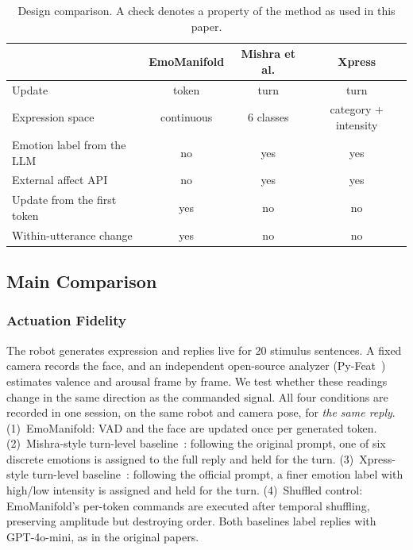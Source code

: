 \documentclass[letterpaper, 10 pt, conference]{ieeeconf/ieeeconf}
\begin{document}
\begin{table}[t]
    \caption{Design comparison. A check denotes a property of the method as used in this paper.}
    \label{tab:design}
    \centering
    \begin{tabular}{lccc}
    \toprule
     & EmoManifold & Mishra et al. & Xpress \\
    \midrule
    Update & token & turn & turn \\
    Expression space & continuous & 6 classes & category + intensity \\
    Emotion label from the LLM & no & yes & yes \\
    External affect API & no & yes & yes \\
    Update from the first token & yes & no & no \\
    Within-utterance change & yes & no & no \\
    \bottomrule
    \end{tabular}
\end{table}

\subsection{Main Comparison}
\label{sec:exp_hardware}

\subsubsection{Actuation Fidelity}
The robot generates expression and replies live for 20 stimulus sentences. A fixed camera records the face, and an independent open-source analyzer (Py-Feat~\cite{cheong2023pyfeat}) estimates valence and arousal frame by frame. We test whether these readings change in the same direction as the commanded signal. All four conditions are recorded in one session, on the same robot and camera pose, for \emph{the same reply}. (1)~EmoManifold: VAD and the face are updated once per generated token. (2)~Mishra-style turn-level baseline~\cite{mishra2023realtime}: following the original prompt, one of six discrete emotions is assigned to the full reply and held for the turn. (3)~Xpress-style turn-level baseline~\cite{antony2025xpress}: following the official prompt, a finer emotion label with high/low intensity is assigned and held for the turn. (4)~Shuffled control: EmoManifold's per-token commands are executed after temporal shuffling, preserving amplitude but destroying order. Both baselines label replies with GPT-4o-mini, as in the original papers.
\end{document}
